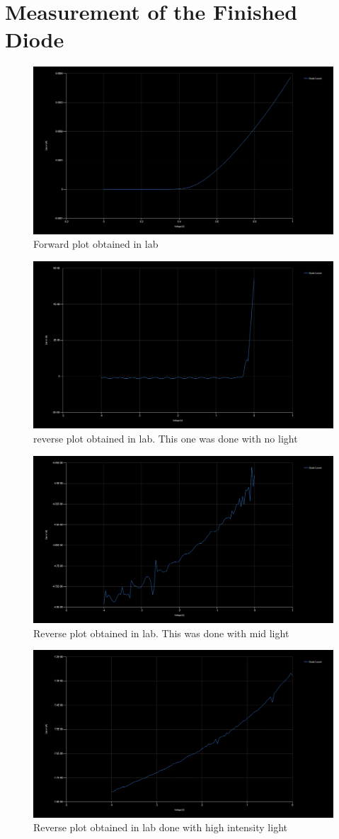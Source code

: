 \section{Measurement of the Finished Diode}
\begin{figure}[H]
    \centering
    \includegraphics[width=.6\textwidth]{figures/Forward_Graph.png}
    \caption{Forward plot obtained in lab}
    \label{fig:forward}
\end{figure}
\begin{figure}[H]
    \centering
    \includegraphics[width=.6\textwidth]{figures/Reverse_nolight.png}
    \caption{reverse plot obtained in lab. This one was done with no light}
    \label{fig:revnolight}
\end{figure}
\begin{figure}[H]
    \centering
    \includegraphics[width=.6\textwidth]{figures/Reverse_midlight.png}
    \caption{Reverse plot obtained in lab. This was done with mid light}
    \label{fig:revmidlight}
\end{figure}
\begin{figure}[H]
    \centering
    \includegraphics[width=.6\textwidth]{figures/reverse_highlight.png}
    \caption{Reverse plot obtained in lab done with high intensity light}
    \label{fig:revhighlight}
\end{figure}

